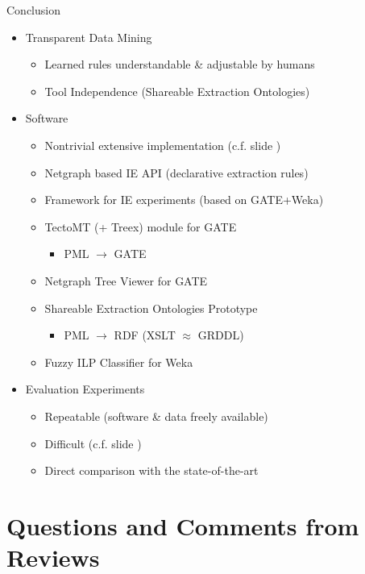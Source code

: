 \documentclass[xcolor=dvipsnames]{beamer}
\begin{document}
\begin{frame}{Conclusion} 
	\begin{itemize}
		\item Transparent Data Mining
		\begin{itemize}
			\item Learned rules understandable \& adjustable by humans
			\item Tool Independence (Shareable Extraction Ontologies)
		\end{itemize}
		
		\item Software
		\begin{itemize}
		\item \alert{Nontrivial extensive implementation} (c.f. slide \pageref{implementation})
		\item Netgraph based IE API (declarative extraction rules)
		\item Framework for IE experiments (based on GATE+Weka)
		\item TectoMT (+ Treex) module for GATE
		\begin{itemize}
			\item PML $\rightarrow$ GATE
		\end{itemize}
		\item Netgraph Tree Viewer for GATE
		\item Shareable Extraction Ontologies Prototype
		\begin{itemize}
			\item PML $\rightarrow$ RDF (XSLT $\approx$ GRDDL)
		\end{itemize}
		\item Fuzzy ILP Classifier for Weka
		\end{itemize}

		\item Evaluation Experiments
		\begin{itemize}
			\item \alert{Repeatable} (software \& data freely available)
			\item Difficult (c.f. slide \pageref{future_experiments})
			\item Direct comparison with the state-of-the-art
		\end{itemize}
	\end{itemize}
\end{frame}


\section[Questions \& Comments]{Questions and Comments from Reviews} 
\frame{\tableofcontents[currentsection]}
\end{document}
